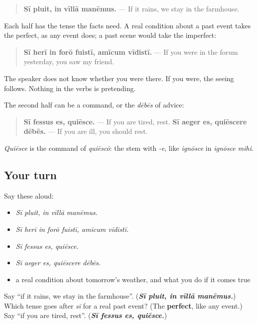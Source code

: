 \begin{grammarlens}[title={Grammar Lens: ordinary verbs on both sides}]
\begin{quote}
\textbf{Sī pluit, in vīllā manēmus.} — If it rains, we stay in the farmhouse.
\end{quote}

Each half has the tense the facts need. A real condition about a past event takes the perfect, as any event does; a past scene would take the imperfect:

\begin{quote}
\textbf{Sī herī in forō fuistī, amīcum vīdistī.} — If you were in the forum yesterday, you saw my friend.
\end{quote}

The speaker does not know whether you were there. If you were, the seeing follows. Nothing in the verbs is pretending.
\end{grammarlens}

\begin{culture}
The second half can be a command, or the \emph{dēbēs} of advice:

\begin{quote}
\textbf{Sī fessus es, quiēsce.} — If you are tired, rest. \textbf{Sī aeger es, quiēscere dēbēs.} — If you are ill, you should rest.
\end{quote}

\emph{Quiēsce} is the command of \emph{quiēscō}: the stem with \emph{-e}, like \emph{ignōsce} in \emph{ignōsce mihi}.
\end{culture}

\subsection*{Your turn}
Say these aloud:

\begin{itemize}
\raggedright
  \item \emph{Sī pluit, in vīllā manēmus.}
  \item \emph{Sī herī in forō fuistī, amīcum vīdistī.}
  \item \emph{Sī fessus es, quiēsce.}
  \item \emph{Sī aeger es, quiēscere dēbēs.}
  \item a real condition about tomorrow's weather, and what you do if it comes true
\end{itemize}

\begin{tcolorbox}[breakable,colback=teal!4,colframe=teal!35!black,title={Before you move on}]
Say \textquotedblleft{}if it rains, we stay in the farmhouse\textquotedblright{}. (\emph{\textbf{Sī pluit, in vīllā manēmus.}}) Which tense goes after \emph{sī} for a real past event? (The \textbf{perfect}, like any event.) Say \textquotedblleft{}if you are tired, rest\textquotedblright{}. (\emph{\textbf{Sī fessus es, quiēsce.}})
\end{tcolorbox}
